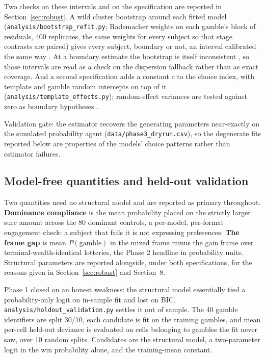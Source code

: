 \documentclass[11pt]{article}
\begin{document}
Two checks on these intervals and on the specification are reported in Section~\ref{sec:robust}. A
wild cluster bootstrap around each fitted model (\texttt{analysis/bootstrap\_refit.py}; Rademacher
weights on each gamble's block of residuals, 400 replicates, the same weights for every subject so
that stage contrasts are paired) gives every subject, boundary or not, an interval calibrated the same
way \citep{cameron2008}. At a boundary estimate the bootstrap is itself inconsistent \citep{andrews2000},
so those intervals are read as a check on the dispersion fallback rather than as exact coverage. And a
second specification adds a constant $c$ to the choice index, with template and gamble random
intercepts on top of it (\texttt{analysis/template\_effects.py}); random-effect variances are tested
against zero as boundary hypotheses \citep{self1987}.

Validation gate: the estimator recovers the generating parameters near-exactly on the simulated
probability agent (\texttt{data/phase3\_dryrun.csv}), so the degenerate fits reported below are
properties of the models' choice patterns rather than estimator failures.

\subsection{Model-free quantities and held-out validation}
Two quantities need no structural model and are reported as primary throughout. \textbf{Dominance
compliance} is the mean probability placed on the strictly larger sure amount across the 80 dominant
controls, a per-model, per-format engagement check: a subject that fails it is not expressing
preferences. \textbf{The frame gap} is mean $P(\text{gamble})$ in the mixed frame minus the gain frame
over terminal-wealth-identical lotteries, the Phase 2 headline in probability units. Structural
parameters are reported alongside, under both specifications, for the reasons given in
Section~\ref{sec:robust} and Section~8.

Phase 1 closed on an honest weakness: the structural model essentially tied a probability-only logit on
in-sample fit and lost on BIC. \texttt{analysis/holdout\_validation.py} settles it out of sample. The 40
gamble identifiers are split 30/10, each candidate is fit on the training gambles, and mean per-cell
held-out deviance is evaluated on cells belonging to gambles the fit never saw, over 10 random splits.
Candidates are the structural model, a two-parameter logit in the win probability alone, and the
training-mean constant.
\end{document}
